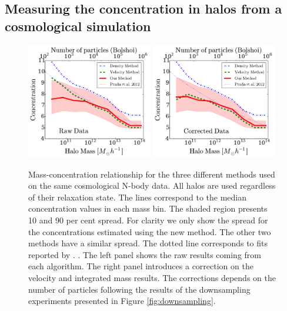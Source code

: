 \documentclass{emulateapj}
\begin{document}
\subsection{Measuring the concentration in halos from a cosmological simulation}
\label{subsec:cosmo}

\begin{figure}
\begin{center}
  \includegraphics[width=0.49\textwidth]{concentration_bolshoi.pdf}
  \includegraphics[width=0.49\textwidth]{concentration_bolshoi_corrected.pdf}
\end{center}
\vspace{-0.5cm}
\caption{Mass-concentration relationship for the three different
  methods used on the same cosmological N-body data.  All halos are
  used regardless of their relaxation state.  The lines correspond to
  the median concentration values in each mass bin.  The shaded region
  presents 10 and 90 per cent spread.  For clarity we only show the
  spread for the concentrations estimated using the new method. The
  other two methods have a similar spread. The dotted line corresponds
  to fits reported by \citep{Prada2012}.
  \label{fig:concentration}. The left panel shows the raw results
  coming from each algorithm. The right panel introduces a
  correction on the velocity and integrated mass results. 
  The corrections depends on the number of particles following the
  results of the downsampling experiments presented in Figure
  \ref{fig:downsampling}.} 
\end{figure}
\end{document}
